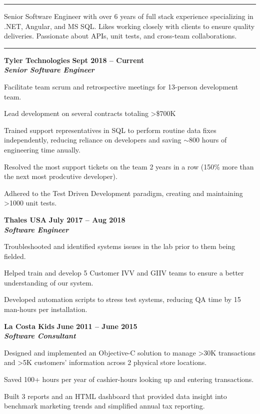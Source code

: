 \documentclass[10pt]{article}
\newcommand{\thing}[1][]{\item #1}
\newcommand{\sectionheader}[1]{
    \vspace{3pt}
    \StrSplit{#1}{3}{\firstpart}{\lastpart} %

    \makebox[0pt][l]{\textbf{\LARGE\firstpart\lastpart}}%
    \rule[-1ex]{\columnwidth}{.1pt}

}
\newcommand{\dates}[2]{
    \textbf{#1 -- #2}
}
\begin{document}
    \sectionheader{Professional Summary}
    Senior Software Engineer with over 6 years of full stack
        experience specializing in .NET, Angular, and MS SQL.
        Likes working closely with clients to ensure quality
        deliveries. Passionate about APIs, unit tests, and
        cross-team collaborations.
    
    \sectionheader{Experience}
    \textbf{\large Tyler Technologies} \hfill \dates{Sept 2018}{Current}\\
    \textit{\textbf{Senior Software Engineer}}
    \begin{things}
        \thing Facilitate team scrum and retrospective meetings for 13-person development team.
        \thing Lead development on several contracts totaling \textgreater\$700K
        \thing Trained support representatives in SQL to perform routine
                    data fixes independently, reducing reliance on developers
                    and saving $\sim$800 hours of engineering time anually.
        \thing Resolved the most support tickets on the team 2 years in
                    a row (150\% more than the next most prodcutive developer).
        \thing Adhered to the Test Driven Development paradigm,
                    creating and maintaining \textgreater1000 unit tests.
    \end{things}

    \textbf{\large Thales USA} \hfill \dates{July 2017}{Aug 2018}\\
    \textit{\textbf{Software Engineer}}
    \begin{things}
        \thing Troubleshooted and identified systems issues in 
                    the lab prior to them being fielded.
        \thing Helped train and develop 5 Customer IVV and 
                    GIIV teams to ensure a better understanding of our system.
        \thing Developed automation scripts to stress test systems, reducing
                    QA time by 15 man-hours per installation.
    \end{things}

    \textbf{\large La Costa Kids} \hfill \dates{June 2011}{June 2015}\\
    \textit{\textbf{Software Consultant}}
    \begin{things}
        \thing Designed and implemented an Objective-C solution to
                manage \textgreater30K transactions and \textgreater5K
                customers' information across 2 physical store locations.
        \thing Saved 100+ hours per year of cashier-hours looking
                up and entering transactions.
        \thing Built 3 reports and an HTML dashboard that provided data insight
                into benchmark marketing trends and simplified annual tax reporting.
    \end{things}
\end{document}
